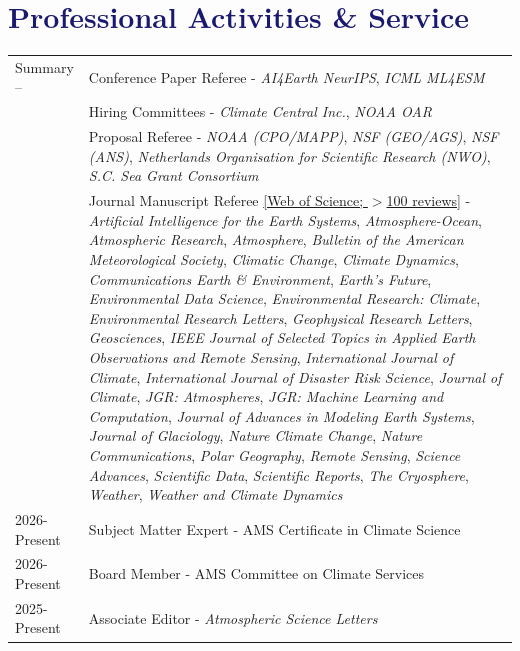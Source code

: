 \documentclass[margin,line,palatino,courier,10pt]{res}
\begin{document}
\begin{resume}
\noindent\textcolor{MidnightBlue}{\makebox[\linewidth][r]{\rule{\textwidth}{5pt}}}
\section{\sc \textcolor{MidnightBlue}{\large{\textbf{Professional Activities \& Service}}}}
\vspace*{0.05in}
\begin{tabular}{@{}p{0.9in}p{4in}}
 Summary -- & Conference Paper Referee - \textit{AI4Earth NeurIPS}, \textit{ICML ML4ESM}\\
 & Hiring Committees - \textit{Climate Central Inc.}, \textit{NOAA OAR}\\
 & Proposal Referee - \textit{NOAA (CPO/MAPP)}, \textit{NSF (GEO/AGS)}, \textit{NSF (ANS)}, \textit{Netherlands Organisation for Scientific Research (NWO)}, \textit{S.C. Sea Grant Consortium}\\
 & Journal Manuscript Referee \href{https://www.webofscience.com/wos/author/record/J-4764-2019}{[Web of Science; $>$100 reviews]} - \textit{Artificial Intelligence for the Earth Systems}, \textit{Atmosphere-Ocean}, \textit{Atmospheric Research}, \textit{Atmosphere}, \textit{Bulletin of the American Meteorological Society}, \textit{Climatic Change}, \textit{Climate Dynamics}, \textit{Communications Earth \& Environment}, \textit{Earth's Future}, \textit{Environmental Data Science}, \textit{Environmental Research: Climate}, \textit{Environmental Research Letters}, \textit{Geophysical Research Letters}, \textit{Geosciences}, \textit{IEEE Journal of Selected Topics in Applied Earth Observations and Remote Sensing}, \textit{International Journal of Climate}, \textit{International Journal of Disaster Risk Science}, \textit{Journal of Climate}, \textit{JGR: Atmospheres}, \textit{JGR: Machine Learning and Computation}, \textit{Journal of Advances in Modeling Earth Systems}, \textit{Journal of Glaciology}, \textit{Nature Climate Change}, \textit{Nature Communications}, \textit{Polar Geography}, \textit{Remote Sensing}, \textit{Science Advances}, \textit{Scientific Data}, \textit{Scientific Reports}, \textit{The Cryosphere}, \textit{Weather}, \textit{Weather and Climate Dynamics} \\
2026-Present & Subject Matter Expert - AMS Certificate in Climate Science\\
2026-Present & Board Member - AMS Committee on Climate Services\\
2025-Present & Associate Editor - \textit{Atmospheric Science Letters}\\

\end{tabular}
\end{resume}
\end{document}
